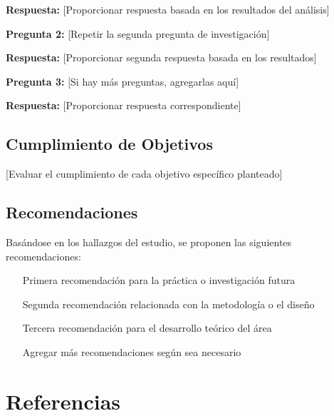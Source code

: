 \documentclass[12pt, letterpaper]{article}
\begin{document}
\textbf{Respuesta:} [Proporcionar respuesta basada en los resultados del análisis]

\textbf{Pregunta 2:} [Repetir la segunda pregunta de investigación]

\textbf{Respuesta:} [Proporcionar segunda respuesta basada en los resultados]

\textbf{Pregunta 3:} [Si hay más preguntas, agregarlas aquí]

\textbf{Respuesta:} [Proporcionar respuesta correspondiente]

\subsection{Cumplimiento de Objetivos}

[Evaluar el cumplimiento de cada objetivo específico planteado]

\subsection{Recomendaciones}

Basándose en los hallazgos del estudio, se proponen las siguientes recomendaciones:

\begin{enumerate}
    \item [Primera recomendación para la práctica o investigación futura]
    \item [Segunda recomendación relacionada con la metodología o el diseño]
    \item [Tercera recomendación para el desarrollo teórico del área]
    \item [Agregar más recomendaciones según sea necesario]
\end{enumerate}

\newpage

\section{Referencias}

\printbibliography[heading=none]

\end{document}
